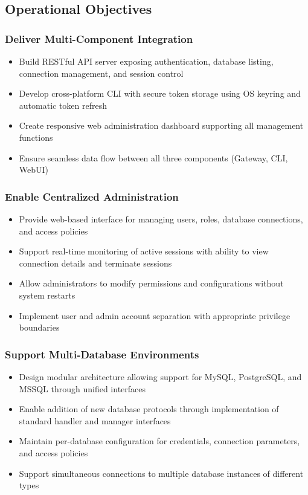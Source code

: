 \subsection{Operational Objectives}

\subsubsection{Deliver Multi-Component Integration}
\begin{itemize}
    \item Build RESTful API server exposing authentication, database listing, connection management, and session control
    \item Develop cross-platform CLI with secure token storage using OS keyring and automatic token refresh
    \item Create responsive web administration dashboard supporting all management functions
    \item Ensure seamless data flow between all three components (Gateway, CLI, WebUI)
\end{itemize}

\subsubsection{Enable Centralized Administration}
\begin{itemize}
    \item Provide web-based interface for managing users, roles, database connections, and access policies
    \item Support real-time monitoring of active sessions with ability to view connection details and terminate sessions
    \item Allow administrators to modify permissions and configurations without system restarts
    \item Implement user and admin account separation with appropriate privilege boundaries
\end{itemize}

\subsubsection{Support Multi-Database Environments}
\begin{itemize}
    \item Design modular architecture allowing support for MySQL, PostgreSQL, and MSSQL through unified interfaces
    \item Enable addition of new database protocols through implementation of standard handler and manager interfaces
    \item Maintain per-database configuration for credentials, connection parameters, and access policies
    \item Support simultaneous connections to multiple database instances of different types
\end{itemize}

